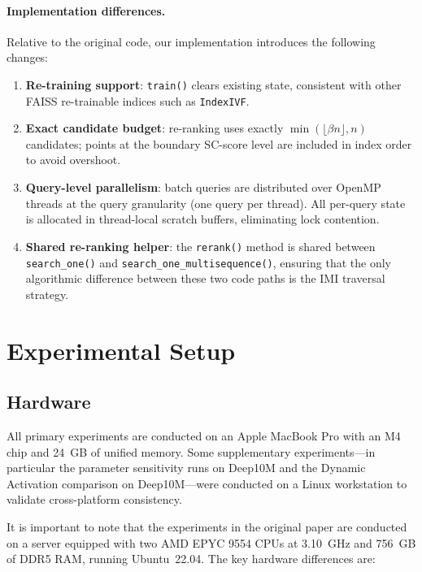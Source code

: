 \documentclass[11pt,a4paper]{article}
\begin{document}
\paragraph{Implementation differences.}
Relative to the original code, our implementation introduces the following
changes:
\begin{enumerate}
  \item \textbf{Re-training support}: \texttt{train()} clears existing state,
    consistent with other FAISS re-trainable indices such as
    \texttt{IndexIVF}.
  \item \textbf{Exact candidate budget}: re-ranking uses exactly
    $\min(\lfloor\beta n\rfloor, n)$ candidates; points at the boundary
    SC-score level are included in index order to avoid overshoot.
  \item \textbf{Query-level parallelism}: batch queries are distributed over
    OpenMP threads at the query granularity (one query per thread).  All per-query
    state is allocated in thread-local scratch buffers, eliminating lock
    contention.
  \item \textbf{Shared re-ranking helper}: the \texttt{rerank()} method is
    shared between \texttt{search\_one()} and \texttt{search\_one\_multisequence()},
    ensuring that the only algorithmic difference between these two code paths
    is the IMI traversal strategy.
\end{enumerate}

\section{Experimental Setup}

\subsection{Hardware}

All primary experiments are conducted on an Apple MacBook Pro with an M4
chip and 24~GB of unified memory.  Some supplementary experiments---in
particular the parameter sensitivity runs on Deep10M and the Dynamic
Activation comparison on Deep10M---were conducted on a Linux workstation to
validate cross-platform consistency.

It is important to note that the experiments in the original paper are
conducted on a server equipped with two AMD EPYC 9554 CPUs at 3.10~GHz and
756~GB of DDR5 RAM, running Ubuntu~22.04.  The key hardware differences are:
\end{document}
